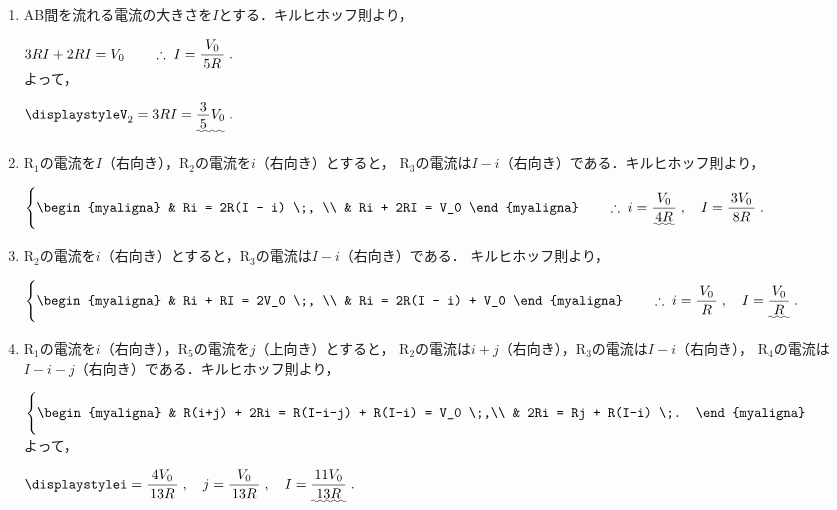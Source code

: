 ﻿\documentclass[../../../ps_a.tex]{subfiles}
\begin{document}
    \begin{enumerate}
        \item AB間を流れる電流の大きさを$I$とする．キルヒホッフ則より，
        
            \myspaceb%
            $\displaystyle%
                3RI + 2RI = V_0 \qquad \therefore \; I = \myfracc{V_0}{5R} \;.
            $\\
            よって，
            
            \myspaceb%
            $\displaystyle%
                V_{2} = 3RI = \uwave{\myfraca{3}{5}V_0} \;.
            $
        \item R$_1$の電流を$I$（右向き），R$_2$の電流を$i$（右向き）とすると，
            R$_3$の電流は$I - i$（右向き）である．キルヒホッフ則より，
        
            \myspaceb%
            $\displaystyle%
                \Biggl\{%
                \begin{myaligna}
                    & Ri = 2R(I - i) \;, \\
                    & Ri + 2RI = V_0
                \end{myaligna}
                \qquad \therefore \; i=\uwave{\myfracc{V_0}{4R}} \;,
                \quad I = \myfracc{3V_0}{8R} \;.
            $
        \item R$_2$の電流を$i$（右向き）とすると，R$_3$の電流は$I-i$（右向き）である．
            キルヒホッフ則より，

            \myspaceb%
            $\displaystyle%
                \Biggl\{%
                \begin{myaligna}
                    & Ri + RI = 2V_0 \;, \\
                    & Ri = 2R(I - i) + V_0
                \end{myaligna}
                \qquad \therefore \; i=\myfracc{V_0}{R} \;,
                \quad I = \uwave{\myfracc{V_0}{R}} \;.
            $
        \item R$_1$の電流を$i$（右向き），R$_5$の電流を$j$（上向き）とすると，
            R$_2$の電流は$i+j$（右向き），R$_3$の電流は$I-i$（右向き），
            R$_4$の電流は$I-i-j$（右向き）である．キルヒホッフ則より，
                    
            \myspaceb%
            $\displaystyle%
                \Biggl\{%
                \begin{myaligna}
                    & R(i+j) + 2Ri = R(I-i-j) + R(I-i) = V_0 \;,\\
                    & 2Ri = Rj + R(I-i) \;.
                \end{myaligna}
            $\\
            よって，
            
            \myspaceb%
            $\displaystyle%
                i = \myfracc{4V_0}{13R} \;, \quad j = \myfracc{V_0}{13R} \;,
                \quad I = \uwave{\myfracc{11V_0}{13R}} \;.
            $
    \end{enumerate}
\end{document}
